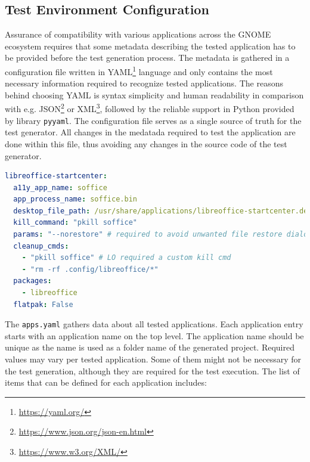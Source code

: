 \subsection{Test Environment Configuration}\label{env_config}
Assurance of compatibility with various applications across the GNOME ecosystem requires that some metadata describing the tested application has to be provided before the test generation process. The metadata is gathered in a configuration file written in YAML\footnote{\url{https://yaml.org/}} language and only contains the most necessary information required to recognize tested applications. The reasons behind choosing YAML is syntax simplicity and human readability in comparison with e.g. JSON\footnote{\url{https://www.json.org/json-en.html}} or XML\footnote{\url{https://www.w3.org/XML/}}, followed by the reliable support in Python provided by library \texttt{pyyaml}.\cite{yaml} The  configuration file serves as a single source of truth for the test generator. All changes in the medatada required to test the application are done within this file, thus avoiding any changes in the source code of the test generator.

\begin{lstlisting}[language=yaml,caption={Example of the apps.yaml entry for LibreOffice Start Center},label={apps.yaml}]
libreoffice-startcenter:
  a11y_app_name: soffice
  app_process_name: soffice.bin
  desktop_file_path: /usr/share/applications/libreoffice-startcenter.desktop
  kill_command: "pkill soffice"
  params: "--norestore" # required to avoid unwanted file restore dialogs
  cleanup_cmds:
    - "pkill soffice" # LO required a custom kill cmd
    - "rm -rf .config/libreoffice/*"
  packages:
    - libreoffice
  flatpak: False
\end{lstlisting}

The \texttt{apps.yaml} gathers data about all tested applications. Each application entry starts with an application name on the top level. The application name should be unique as the name is used as a folder name of the generated project. Required values may vary per tested application. Some of them might not be necessary for the test generation, although they are required for the test execution.
\newpage
The list of items that can be defined for each application includes:

